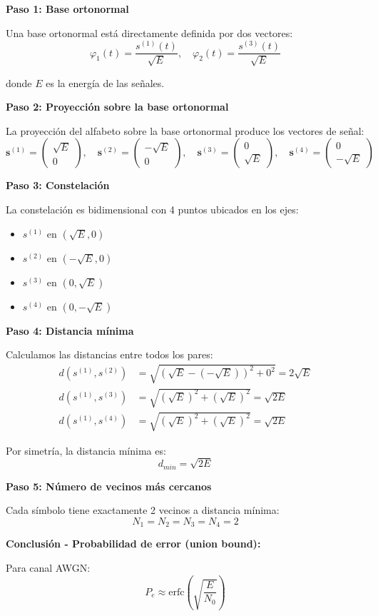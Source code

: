 \documentclass[10pt,a4paper]{article}
\begin{document}
\begin{solucion}
\textbf{Paso 1: Base ortonormal}

Una base ortonormal está directamente definida por dos vectores:
\[
\varphi_1(t) = \frac{s^{(1)}(t)}{\sqrt{E}}, \quad \varphi_2(t) = \frac{s^{(3)}(t)}{\sqrt{E}}
\]

donde $E$ es la energía de las señales.

\textbf{Paso 2: Proyección sobre la base ortonormal}

La proyección del alfabeto sobre la base ortonormal produce los vectores de señal:
\[
\mathbf{s}^{(1)} = \begin{pmatrix} \sqrt{E} \\ 0 \end{pmatrix}, \quad
\mathbf{s}^{(2)} = \begin{pmatrix} -\sqrt{E} \\ 0 \end{pmatrix}, \quad
\mathbf{s}^{(3)} = \begin{pmatrix} 0 \\ \sqrt{E} \end{pmatrix}, \quad
\mathbf{s}^{(4)} = \begin{pmatrix} 0 \\ -\sqrt{E} \end{pmatrix}
\]

\textbf{Paso 3: Constelación}

La constelación es bidimensional con 4 puntos ubicados en los ejes:
\begin{itemize}
\item $s^{(1)}$ en $(\sqrt{E}, 0)$
\item $s^{(2)}$ en $(-\sqrt{E}, 0)$
\item $s^{(3)}$ en $(0, \sqrt{E})$
\item $s^{(4)}$ en $(0, -\sqrt{E})$
\end{itemize}

\textbf{Paso 4: Distancia mínima}

Calculamos las distancias entre todos los pares:
\begin{align*}
d(s^{(1)}, s^{(2)}) &= \sqrt{(\sqrt{E} - (-\sqrt{E}))^2 + 0^2} = 2\sqrt{E}\\
d(s^{(1)}, s^{(3)}) &= \sqrt{(\sqrt{E})^2 + (\sqrt{E})^2} = \sqrt{2E}\\
d(s^{(1)}, s^{(4)}) &= \sqrt{(\sqrt{E})^2 + (\sqrt{E})^2} = \sqrt{2E}
\end{align*}

Por simetría, la distancia mínima es:
\[
\boxed{d_{min} = \sqrt{2E}}
\]

\textbf{Paso 5: Número de vecinos más cercanos}

Cada símbolo tiene exactamente 2 vecinos a distancia mínima:
\[
\boxed{N_1 = N_2 = N_3 = N_4 = 2}
\]

\textbf{Conclusión - Probabilidad de error (union bound):}

Para canal AWGN:
\[
P_e \approx \text{erfc}\left(\sqrt{\frac{E}{N_0}}\right)
\]
\end{solucion}
\end{document}

